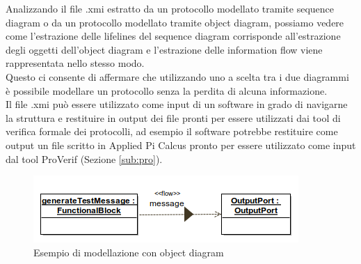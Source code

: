 Analizzando il file .xmi estratto da un protocollo modellato tramite sequence diagram o da un protocollo modellato tramite object diagram, possiamo vedere come l'estrazione delle lifelines del sequence diagram corrisponde all'estrazione degli oggetti dell'object diagram e l'estrazione delle information flow viene rappresentata nello stesso modo.\\
Questo ci consente di affermare che utilizzando uno a scelta tra i due diagrammi è possibile modellare un protocollo senza la perdita di alcuna informazione.\\
Il file .xmi può essere utilizzato come input di un software in grado di navigarne la struttura e restituire in output dei file pronti per essere utilizzati dai tool di verifica formale dei protocolli, ad esempio il software potrebbe restituire come output un file scritto in Applied Pi Calcus pronto per essere utilizzato come input dal tool ProVerif (Sezione \ref*{sub:pro}).

\newpage
\begin{figure}[h!]
    \includegraphics[scale=0.7]{xmi/ex.png} 
    \caption{Esempio di modellazione con object diagram}
\end{figure}


